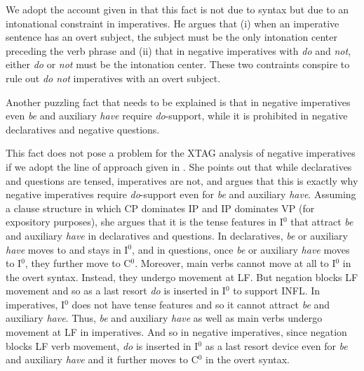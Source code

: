 
We adopt the account given in \cite{akmajian84} that this fact is not due
to syntax but due to an intonational constraint in imperatives.  He argues
that (i) when an imperative sentence has an overt subject, the subject must be
the only intonation center preceding the verb phrase and (ii) that in
negative imperatives with {\it do} and {\it not}, either {\it do} or {\it
not} must be the intonation center.  These two contraints conspire to rule
out {\it do not} imperatives with an overt subject.

Another puzzling fact that needs to be explained  is that in negative
imperatives even {\it be} and auxiliary {\it have} require {\it
do}-support, while it is prohibited in negative declaratives and negative
questions.  



This fact does not pose a problem for the XTAG analysis of negative
imperatives if we adopt the line of approach given in \cite{handiss}.  She
points out that while declaratives and questions are tensed, imperatives
are not, and argues that this is exactly why negative imperatives require
{\it do}-support even for {\it be} and auxiliary {\it have}.  Assuming a
clause structure in which CP dominates IP and IP dominates VP (for
expository purposes), she argues that it is the tense features in I$^0$
that attract {\it be} and auxiliary {\it have} in declaratives and
questions.  In declaratives, {\it be} or auxiliary {\it have} moves to and
stays in I$^0$, and in questions, once {\it be} or auxiliary {\it have}
moves to I$^0$, they further move to C$^0$.  Moreover, main verbs cannot
move at all to I$^0$ in the overt syntax.  Instead, they undergo movement
at LF.  But negation blocks LF movement and so as a last resort {\it do} is
inserted in I$^0$ to support INFL.  In imperatives, I$^0$ does not have
tense features and so it cannot attract {\it be} and auxiliary {\it have}.
Thus, {\it be} and auxiliary {\it have} as well as main verbs undergo
movement at LF in imperatives.  And so in negative imperatives, since
negation blocks LF verb movement, {\it do} is inserted in I$^0$ as a last
resort device even for {\it be} and auxiliary {\it have} and it further
moves to C$^0$ in the overt syntax.


